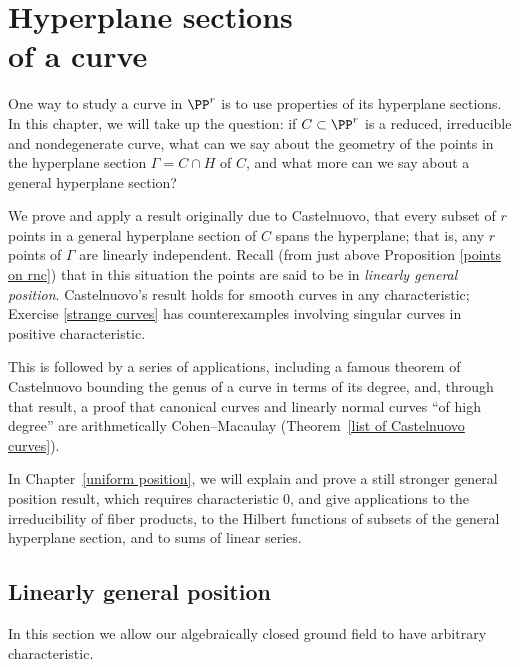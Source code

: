 
\begingroup %
\def\mult(#1){\operatorname{mulsec}#1} %

\chapter[Hyperplane sections of a curve]{Hyperplane sections\\of a curve}
\label{linear general position chapter}

One way to study a curve in $\PP^r$ is to use properties of its hyperplane
sections. In this chapter, we will take up the question: if $C \subset
\PP^r$ is a reduced, irreducible and nondegenerate curve, what can we say
about the geometry of the points in the  hyperplane section
$\Gamma = C \cap H$ of $C$, and what more can we say about a general hyperplane
section?

We prove and apply a result originally due to Castelnuovo,
%
that every subset of $r$ points in a
general hyperplane section
%
of $C$ spans the hyperplane; that is, any $r$
points of $\Gamma$ are linearly independent.
Recall (from just above Proposition \ref{points on rnc}) that
in this situation
the points
are said to be
in \emph{linearly general position}.
%
Castelnuovo's result
holds for smooth curves in
any characteristic;
%
Exercise \ref{strange curves} has
counterexamples involving singular curves in positive
characteristic.

This is followed by a series of applications,
including
a
%
famous theorem of Castelnuovo bounding the genus of a
curve in terms of its degree,
and, through that result, a proof that canonical curves and linearly
normal curves ``of high degree'' are arithmetically Cohen--Macaulay
%
(Theorem~\ref{list of Castelnuovo curves}).

In Chapter~\ref{uniform position}, we will explain and prove a still
stronger general position result, which requires characteristic 0, and
give applications to the irreducibility of fiber products, to the Hilbert
functions of subsets of the
general hyperplane section, and to sums of linear series.

\section{Linearly general position}\label{linearly general position
section}
In this section we
allow our algebraically closed ground field to
have arbitrary characteristic.

